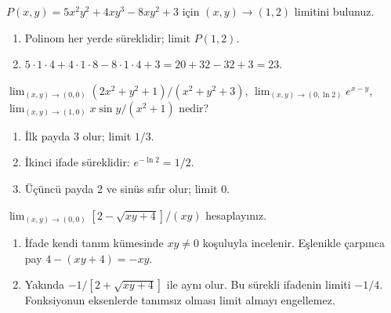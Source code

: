 \begin{tcolorbox}[title={Örnek 4.6 | Polinom limiti},colframe=accent]\(P(x,y)=5x^2y^2+4xy^3-8xy^2+3\) için \((x,y)\to(1,2)\) limitini bulunuz.
\par{}\end{tcolorbox}
\begin{tcolorbox}[title={Adım adım çözüm},colback=green!3!white,colframe=green]\begin{enumerate}
\item Polinom her yerde süreklidir; limit \(P(1,2)\).
\item \(5\cdot1\cdot4+4\cdot1\cdot8-8\cdot1\cdot4+3=20+32-32+3=23\).
\end{enumerate}\end{tcolorbox}
\begin{tcolorbox}[title={Örnek 4.7 | Dersin kısa limitleri},colframe=accent]\(\lim_{(x,y)\to(0,0)}(2x^2+y^2+1)/(x^2+y^2+3)\), \(\lim_{(x,y)\to(0,\ln2)}e^{x-y}\), \(\lim_{(x,y)\to(1,0)}x\sin y/(x^2+1)\) nedir?
\par{}\end{tcolorbox}
\begin{tcolorbox}[title={Adım adım çözüm},colback=green!3!white,colframe=green]\begin{enumerate}
\item İlk payda 3 olur; limit \(1/3\).
\item İkinci ifade süreklidir: \(e^{-\ln2}=1/2\).
\item Üçüncü payda 2 ve sinüs sıfır olur; limit 0.
\end{enumerate}\end{tcolorbox}
\begin{tcolorbox}[title={Örnek 4.8 | Eşlenikle sadeleştirme},colframe=accent]\(\lim_{(x,y)\to(0,0)}[2-\sqrt{xy+4}]/(xy)\) hesaplayınız.
\par{}\end{tcolorbox}
\begin{tcolorbox}[title={Adım adım çözüm},colback=green!3!white,colframe=green]\begin{enumerate}
\item İfade kendi tanım kümesinde \(xy\ne0\) koşuluyla incelenir. Eşlenikle çarpınca pay \(4-(xy+4)=-xy\).
\item Yakında \(-1/[2+\sqrt{xy+4}]\) ile aynı olur. Bu sürekli ifadenin limiti \(-1/4\). Fonksiyonun eksenlerde tanımsız olması limit almayı engellemez.
\end{enumerate}\end{tcolorbox}
